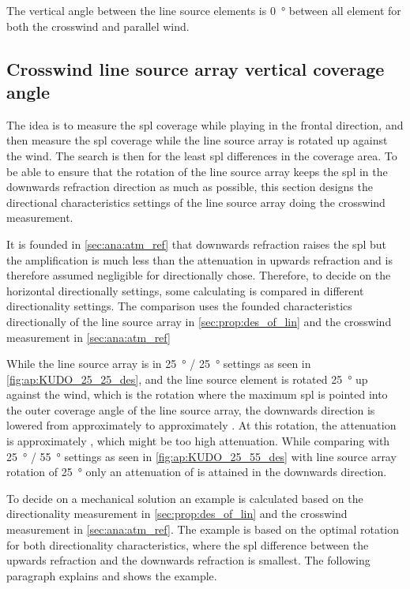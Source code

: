 
The vertical angle between the line source elements is \SI{0}{\degree} between all element for both the crosswind and parallel wind.  

\subsection{Crosswind line source array vertical coverage angle} \label{sub:des:cros_set}
The idea is to measure the \gls{spl} coverage while playing in the frontal direction, and then measure the \gls{spl} coverage while the line source array is rotated up against the wind. The search is then for the least \gls{spl} differences in the coverage area. To be able to ensure that the rotation of the line source array keeps the \gls{spl} in the downwards refraction direction as much as possible, this section designs the directional characteristics settings of the line source array doing the crosswind measurement.

It is founded in \autoref{sec:ana:atm_ref} that downwards refraction raises the \gls{spl} but the amplification is much less than the attenuation in upwards refraction and is therefore assumed negligible for directionally chose. Therefore, to decide on the horizontal directionally settings, some calculating is compared in different directionality settings. The comparison uses the founded characteristics directionally of the line source array in \autoref{sec:prop:des_of_lin} and the crosswind measurement in \autoref{sec:ana:atm_ref}


While the line source array is in \SI{25}{\degree} / \SI{25}{\degree} settings as seen in \autoref{fig:ap:KUDO_25_25_des}, and the line source element is rotated \SI{25}{\degree} up against the wind, which is the rotation where the maximum \gls{spl} is pointed into the outer  coverage angle of the line source array, the downwards direction is lowered from approximately  to approximately . At this rotation, the attenuation is approximately , which might be too high attenuation. While comparing with \SI{25}{\degree} / \SI{55}{\degree} settings as seen in \autoref{fig:ap:KUDO_25_55_des} with line source array rotation of \SI{25}{\degree} only an attenuation of  is attained in the downwards direction. 

To decide on a mechanical solution an example is calculated based on the directionality measurement in \autoref{sec:prop:des_of_lin} and the crosswind measurement in \autoref{sec:ana:atm_ref}. The example is based on the optimal rotation for both directionality characteristics, where the \gls{spl} difference between the upwards refraction and the downwards refraction is smallest. The following paragraph explains and shows the example.


